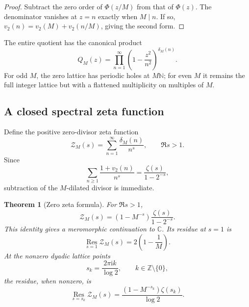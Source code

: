 \documentclass[11pt,oneside]{article}
\newtheorem{theorem}{Theorem}[section]
\theoremstyle{definition}
\theoremstyle{remark}
\newcommand{\C}{\mathbb C}
\newcommand{\N}{\mathbb N}
\newcommand{\Z}{\mathbb Z}
\newcommand{\ii}{\mathrm i}
\newcommand{\vtwo}{v_2}
\numberwithin{equation}{section}
\newcommand{\1}{\mathbf 1}
\begin{document}
\begin{proof}
Subtract the zero order of $\Phi(z/M)$ from that of $\Phi(z)$.  The denominator vanishes
at $z=n$ exactly when $M\mid n$.  If so,
$\vtwo(n)=\vtwo(M)+\vtwo(n/M)$, giving the second form.
\end{proof}

The entire quotient has the canonical product
\begin{equation}
 Q_M(z)=\prod_{n=1}^{\infty}
 \left(1-\frac{z^2}{n^2}\right)^{\delta_M(n)}.
 \label{eq:QM-canonical}
\end{equation}
For odd $M$, the zero lattice has periodic holes at $M\N$; for even $M$ it remains the
full integer lattice but with a flattened multiplicity on multiples of $M$.

\subsection{A closed spectral zeta function}

Define the positive zero-divisor zeta function
\begin{equation}
 \mathcal Z_M(s)=\sum_{n=1}^{\infty}\frac{\delta_M(n)}{n^s},
 \qquad \Re s>1.
 \label{eq:ZM-zeta-def}
\end{equation}
Since
\begin{equation}
 \sum_{n\ge1}\frac{1+\vtwo(n)}{n^s}
 =\frac{\zeta(s)}{1-2^{-s}},
 \label{eq:Phi-zero-zeta}
\end{equation}
subtraction of the $M$-dilated divisor is immediate.

\begin{theorem}[Zero zeta formula]
\label{thm:zero-zeta}
For $\Re s>1$,
\begin{equation}
 \boxed{
 \mathcal Z_M(s)=(1-M^{-s})\frac{\zeta(s)}{1-2^{-s}}.}
 \label{eq:zero-zeta}
\end{equation}
This identity gives a meromorphic continuation to $\C$.  Its residue at $s=1$ is
\begin{equation}
 \operatorname*{Res}_{s=1}\mathcal Z_M(s)=2\left(1-\frac1M\right).
 \label{eq:zeta-res-one}
\end{equation}
At the nonzero dyadic lattice points
\begin{equation}
 s_k=\frac{2\pi\ii k}{\log2},\qquad k\in\Z\setminus\{0\},
 \label{eq:dyadic-complex-dim}
\end{equation}
the residue, when nonzero, is
\begin{equation}
 \operatorname*{Res}_{s=s_k}\mathcal Z_M(s)
 =\frac{(1-M^{-s_k})\zeta(s_k)}{\log2}.
 \label{eq:zeta-res-sk}
\end{equation}
\end{theorem}
\end{document}

